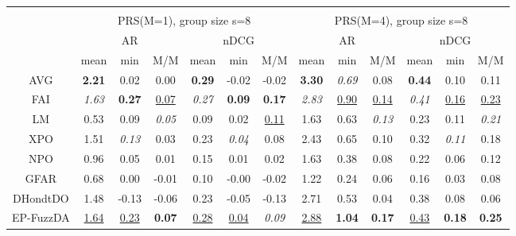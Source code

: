 \begin{tabular}{ c | c c c | c c c || c c c | c c c}
\multicolumn{12}{c}{} \\
\multicolumn{1}{c}{} & \multicolumn{6}{c}{PRS(M=1), group size s=8} & \multicolumn{6}{c}{PRS(M=4), group size s=8} \\
\multicolumn{1}{c}{} & \multicolumn{3}{c}{AR} & \multicolumn{3}{c}{nDCG} & \multicolumn{3}{c}{AR} & \multicolumn{3}{c}{nDCG} \\
& mean & min & M/M & mean & min & M/M & mean & min & M/M & mean & min & M/M \\
\hline
AVG & \textbf{2.21} & 0.02 & 0.00 & \textbf{0.29} & -0.02 & -0.02 & \textbf{3.30} & \textit{0.69} & 0.08 & \textbf{0.44} & 0.10 & 0.11 \\
FAI & \textit{1.63} & \textbf{0.27} & \underline{0.07} & \textit{0.27} & \textbf{0.09} & \textbf{0.17} & \textit{2.83} & \underline{0.90} & \underline{0.14} & \textit{0.41} & \underline{0.16} & \underline{0.23} \\
LM & 0.53 & 0.09 & \textit{0.05} & 0.09 & 0.02 & \underline{0.11} & 1.63 & 0.63 & \textit{0.13} & 0.23 & 0.11 & \textit{0.21} \\
XPO & 1.51 & \textit{0.13} & 0.03 & 0.23 & \textit{0.04} & 0.08 & 2.43 & 0.65 & 0.10 & 0.32 & \textit{0.11} & 0.18 \\
NPO & 0.96 & 0.05 & 0.01 & 0.15 & 0.01 & 0.02 & 1.63 & 0.38 & 0.08 & 0.22 & 0.06 & 0.12 \\
GFAR & 0.68 & 0.00 & -0.01 & 0.10 & -0.00 & -0.02 & 1.22 & 0.24 & 0.06 & 0.16 & 0.03 & 0.08 \\
DHondtDO & 1.48 & -0.13 & -0.06 & 0.23 & -0.05 & -0.13 & 2.71 & 0.53 & 0.04 & 0.38 & 0.08 & 0.06 \\
EP-FuzzDA & \underline{1.64} & \underline{0.23} & \textbf{0.07} & \underline{0.28} & \underline{0.04} & \textit{0.09} & \underline{2.88} & \textbf{1.04} & \textbf{0.17} & \underline{0.43} & \textbf{0.18} & \textbf{0.25} \\

\end{tabular}
